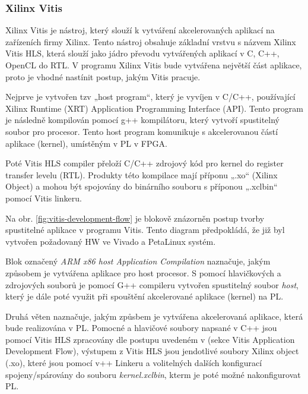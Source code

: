 \documentclass[a4paper, twoside, 11pt]{article}
\begin{document}
		\subsubsection{Xilinx Vitis}\label{subsubsec:xilinx-vitis}
		Xilinx Vitis je nástroj, který slouží k vytváření akcelerovaných aplikací na zařízeních firmy Xilinx. Tento nástroj obsahuje základní vrstvu s názvem Xilinx Vitis HLS, která slouží jako jádro převodu vytvářených aplikací v C, C++, OpenCL do RTL. V programu Xilinx Vitis bude vytvářena největší část aplikace, proto je vhodné nastínit postup, jakým Vitis pracuje.
		\par
		Nejprve je vytvořen tzv „host program“, který je vyvíjen v C/C++, používající Xilinx Runtime (XRT) Application Programming Interface (API). Tento program je následně kompilován pomocí g++ kompilátoru, který vytvoří spustitelný soubor pro procesor. Tento host program komunikuje s akcelerovanou částí aplikace (kernel), umístěným v PL v FPGA. \cite{vitis-unified-software-platform-documentation-2022}\par
		Poté Vitis HLS compiler přeloží C/C++ zdrojový kód pro kernel do register transfer levelu (RTL). Produkty této kompilace mají příponu „.xo“ (Xilinx Object) a mohou být spojovány do binárního souboru s příponou „.xclbin“ pomocí Vitis linkeru. \cite{vitis-unified-software-platform-documentation-2022}\par
		Na obr. \ref{fig:vitis-development-flow} je blokově znázorněn postup tvorby spustitelné aplikace v programu Vitis. Tento diagram předpokládá, že již byl vytvořen požadovaný HW ve Vivado a PetaLinux systém.\par
		Blok označený \textit{ARM x86 host Application Compilation} naznačuje, jakým způsobem je vytvářena aplikace pro host procesor. S pomocí hlavičkových a zdrojových souborů je pomocí G++ compileru vytvořen spustitelný soubor \textit{host}, který je dále poté využit při spouštění akcelerované aplikace (kernel) na PL.\par \cite{vitis-unified-software-platform-documentation-2022}
		Druhá věten naznačuje, jakým způsbem je vytvářena akcelerovaná aplikace, která bude realizována v PL. Pomocné a hlavičové soubory napsané v C++ jsou pomocí Vitis HLS zpracovány dle postupu uvedeném v \cite{vitis-unified-software-platform-documentation-2022} (sekce Vitis Application Development Flow), výstupem z Vitis HLS jsou jendotlivé soubory Xilinx object (.xo), které jsou pomocí v++ Linkeru a volitelných dalších konfigurací spojeny/spárovány do souboru \textit{kernel.xclbin}, kterm je poté možné nakonfigurovat PL. \cite{vitis-unified-software-platform-documentation-2022}\par
\end{document}
